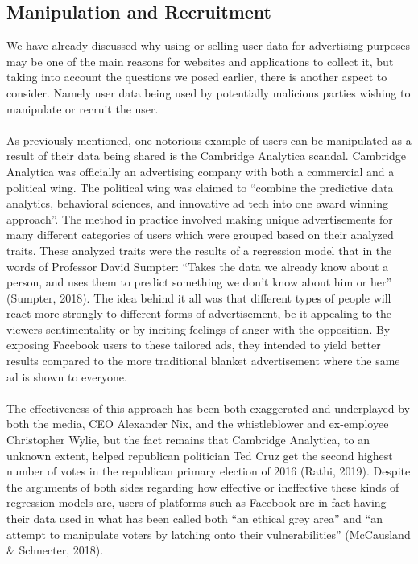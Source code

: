 \documentclass[11pt]{article}
\begin{document}
\subsection{Manipulation and Recruitment}
We have already discussed why using or selling user data for advertising purposes may be one of the main reasons for websites and applications to collect it, but taking into account the questions we posed earlier, there is another aspect to consider. Namely user data being used by potentially malicious parties wishing to manipulate or recruit the user.
\\ \\ 
As previously mentioned, one notorious example of users can be manipulated as a result of their data being shared is the Cambridge Analytica scandal. Cambridge Analytica was officially an advertising company with both a commercial and a political wing. The political wing was claimed to “combine the predictive data analytics, behavioral sciences, and innovative ad tech into one award winning approach”. The method in practice involved making unique advertisements for many different categories of users which were grouped based on their analyzed traits. These analyzed traits were the results of a regression model that in the words of Professor David Sumpter: “Takes the data we already know about a person, and uses them to predict something we don’t know about him or her” (Sumpter, 2018). The idea behind it all was that different types of people will react more strongly to different forms of advertisement, be it appealing to the viewers sentimentality or by inciting feelings of anger with the opposition. By exposing Facebook users to these tailored ads, they intended to yield better results compared to the more traditional blanket advertisement where the same ad is shown to everyone.  
\\ \\
The effectiveness of this approach has been both exaggerated and underplayed by both the media, CEO Alexander Nix, and the whistleblower and ex-employee Christopher Wylie, but the fact remains that Cambridge Analytica, to an unknown extent, helped republican politician Ted Cruz get the second highest number of votes in the republican primary election of 2016 (Rathi, 2019). Despite the arguments of both sides regarding how effective or ineffective these kinds of regression models are, users of platforms such as Facebook are in fact having their data used in what has been called both “an ethical grey area” and “an attempt to manipulate voters by latching onto their vulnerabilities” (McCausland \& Schnecter, 2018). 
\end{document}
